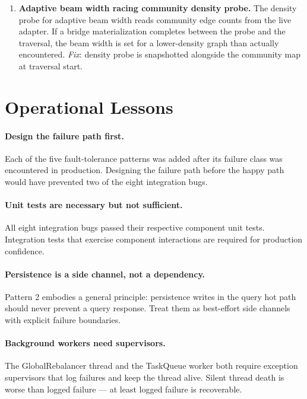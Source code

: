 \documentclass[10pt,twocolumn]{article}
\begin{document}
\begin{enumerate}
  \item \textbf{Adaptive beam width racing community density probe.} The density probe
        for adaptive beam width reads community edge counts from the live adapter.
        If a bridge materialization completes between the probe and the traversal,
        the beam width is set for a lower-density graph than actually encountered.
        \emph{Fix}: density probe is snapshotted alongside the community map at
        traversal start.
\end{enumerate}

\section{Operational Lessons}
\label{sec:lessons}

\paragraph{Design the failure path first.}
Each of the five fault-tolerance patterns was added after its failure class was
encountered in production. Designing the failure path before the happy path would have
prevented two of the eight integration bugs.

\paragraph{Unit tests are necessary but not sufficient.}
All eight integration bugs passed their respective component unit tests. Integration
tests that exercise component interactions are required for production confidence.

\paragraph{Persistence is a side channel, not a dependency.}
Pattern 2 embodies a general principle: persistence writes in the query hot path should
never prevent a query response. Treat them as best-effort side channels with explicit
failure boundaries.

\paragraph{Background workers need supervisors.}
The GlobalRebalancer thread and the TaskQueue worker both require exception supervisors
that log failures and keep the thread alive. Silent thread death is worse than logged
failure — at least logged failure is recoverable.
\end{document}
